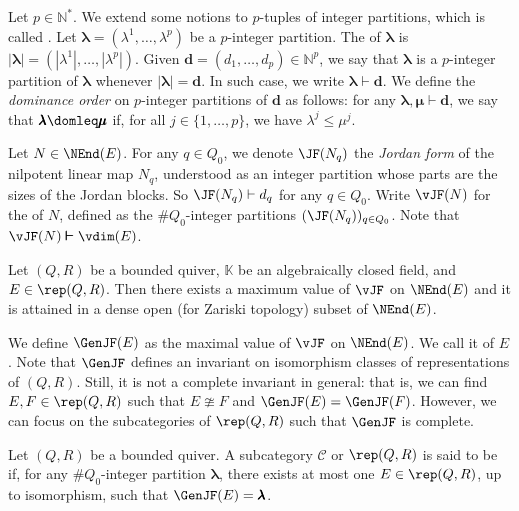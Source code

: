 Let $p \in \mathbb{N}^*$. We extend some notions to $p$-tuples of integer partitions, which is called . Let $\pmb{\lambda} = (\lambda^1, \ldots, \lambda^p)$ be a $p$-integer partition. The  of $\pmb{\lambda}$ is $|\pmb{\lambda}| = (|\lambda^1|, \ldots, |\lambda^p|)$. Given $\pmb{d} = (d_1,\ldots,d_p) \in \mathbb{N}^p$, we say that $\pmb{\lambda}$ is a $p$-integer partition of $\pmb{\lambda}$ whenever $|\pmb{\lambda}| = \pmb{d}$. In such case, we write $\pmb{\lambda} \pmb{\vdash} \pmb{d}$. We define the \emph{dominance order} on $p$-integer partitions of $\pmb{d}$ as follows: for any $\pmb{\lambda},\pmb{\mu} \pmb{\vdash} \pmb{d}$, we say that $\pmb{\lambda} \domleq \pmb{\mu}$ if, for all $j \in \{1,\ldots,p\}$, we have $\lambda^j \leqslant \mu^j$.

Let $N \in \NEnd(E)$. For any $q \in Q_0$, we denote $\JF(N_q)$ the \emph{Jordan form} of the nilpotent linear map $N_q$, understood as an integer partition whose parts are the sizes of the Jordan blocks. So $\JF(N_q) \vdash d_q$ for any $q \in Q_0$. Write $\vJF(N)$ for the  of $N$, defined as the $\#Q_0$-integer partitions $(\JF(N_q))_{q \in Q_0}$. Note that $\vJF(N) \pmb{\vdash} \vdim(E)$.

\begin{theorem} \label{thm:GenJFexists} Let $(Q,R)$ be a bounded quiver, $\mathbb{K}$ be an algebraically closed field, and $E \in \rep(Q,R)$. Then there exists a maximum value of $\vJF$ on $\NEnd(E)$ and it is attained in a dense open (for Zariski topology) subset of $\NEnd(E)$.
\end{theorem}

We define $\GenJF(E)$ as the maximal value of $\vJF$ on $\NEnd(E)$. We call it  of $E$. Note that $\GenJF$ defines an invariant on isomorphism classes of representations of $(Q,R)$. Still, it is not a complete invariant in general: that is, we can find $E,F \in \rep(Q,R)$ such that $E \ncong F$ and $\GenJF(E) = \GenJF(F)$. However, we can focus on the subcategories of $\rep(Q,R)$ such that $\GenJF$ is complete.

\begin{definition} \label{def:JR}
    Let $(Q,R)$ be a bounded quiver. A subcategory $\mathscr{C}$ or $\rep(Q,R)$ is said to be  if, for any $\#Q_0$-integer partition $\pmb{\lambda}$, there exists at most one $E \in \rep(Q,R)$, up to isomorphism, such that $\GenJF(E) = \pmb{\lambda}$.
\end{definition}

